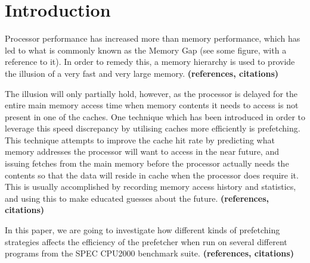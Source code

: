 
\section{Introduction}
\label{sec:introduction}
Processor performance has increased more than memory performance,
which has led to what is commonly known as the Memory Gap (see some
figure, with a reference to it). In order to remedy this, a memory
hierarchy is used to provide the illusion of a very fast and very
large memory. 
{\bf (references, citations)}

The illusion will only partially hold, however, as the processor is
delayed for the entire main memory access time when memory contents it
needs to access is not present in one of the caches. One technique
which has been introduced in order to leverage this speed discrepancy
by utilising caches more efficiently is prefetching. This technique
attempts to improve the cache hit rate by predicting what memory
addresses the processor will want to access in the near future, and
issuing fetches from the main memory before the processor actually
needs the contents so that the data will reside in cache when the
processor does require it. This is usually accomplished by recording
memory access history and statistics, and using this to make educated
guesses about the future. 
{\bf (references, citations)}

In this paper, we are going to investigate how different kinds of
prefetching strategies affects the efficiency of the prefetcher
when run on several different programs from the SPEC CPU2000 benchmark
suite.
{\bf (references, citations)}
